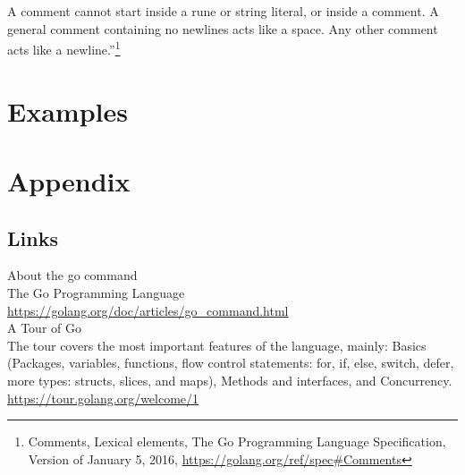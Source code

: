 \documentclass[12pt,letterpaper,dvips]{article}
\begin{document}
\noindent A comment cannot start inside a rune or string literal, or
inside a comment. A general comment containing no newlines
acts like a space. Any other comment acts like a newline.''\footnote{Comments,
Lexical elements, The Go Programming Language Specification,
Version of January 5, 2016,
\href{https://golang.org/ref/spec\#Comments}{https://golang.org/ref/spec\#Comments}}

  
\section{Examples}


\newpage
\setcounter{secnumdepth}{0}
\section{Appendix}


\subsection{Links}

About the go command\\
The Go Programming Language\\
\href{https://golang.org/doc/articles/go\_command.html}{https://golang.org/doc/articles/go\_command.html}
\\

\noindent A Tour of Go\\
The tour covers the most important features of the language,
mainly: Basics (Packages, variables, functions, flow control
statements: for, if, else, switch, defer, more types:
structs, slices, and maps), Methods and interfaces, and
Concurrency.\\
\href{https://tour.golang.org/welcome/}{https://tour.golang.org/welcome/1}
\\
\end{document}
